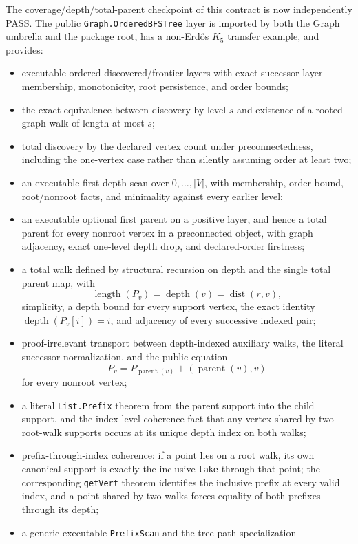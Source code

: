 \documentclass[11pt]{article}
\begin{document}
The coverage/depth/total-parent checkpoint of this contract is now
independently PASS.  The public \texttt{Graph.OrderedBFSTree} layer is imported
by both the Graph umbrella and the package root, has a non-Erdős $K_5$ transfer
example, and provides:
\begin{itemize}
\item executable ordered discovered/frontier layers with exact successor-layer
membership, monotonicity, root persistence, and order bounds;
\item the exact equivalence between discovery by level $s$ and existence of a
rooted graph walk of length at most $s$;
\item total discovery by the declared vertex count under preconnectedness,
including the one-vertex case rather than silently assuming order at least two;
\item an executable first-depth scan over $0,\ldots,|V|$, with membership,
order bound, root/nonroot facts, and minimality against every earlier level;
\item an executable optional first parent on a positive layer, and hence a
total parent for every nonroot vertex in a preconnected object, with graph
adjacency, exact one-level depth drop, and declared-order firstness;
\item a total walk defined by structural recursion on depth and the single
total parent map, with
\[
 \operatorname{length}(P_v)=\operatorname{depth}(v)
 =\operatorname{dist}(r,v),
\]
simplicity, a depth bound for every support vertex, the exact identity
$\operatorname{depth}(P_v[i])=i$, and adjacency of every successive indexed
pair;
\item proof-irrelevant transport between depth-indexed auxiliary walks, the
literal successor normalization, and the public equation
\[
 P_v=P_{\operatorname{parent}(v)}\mathbin{+}(\operatorname{parent}(v),v)
\]
for every nonroot vertex;
\item a literal \texttt{List.Prefix} theorem from the parent support into the
child support, and the index-level coherence fact that any vertex shared by
two root-walk supports occurs at its unique depth index on both walks;
\item prefix-through-index coherence: if a point lies on a root walk, its own
canonical support is exactly the inclusive \texttt{take} through that point;
the corresponding \texttt{getVert} theorem identifies the inclusive prefix at
every valid index, and a point shared by two walks forces equality of both
prefixes through its depth;
\item a generic executable \texttt{PrefixScan} and the tree-path specialization

\end{itemize}
\end{document}
